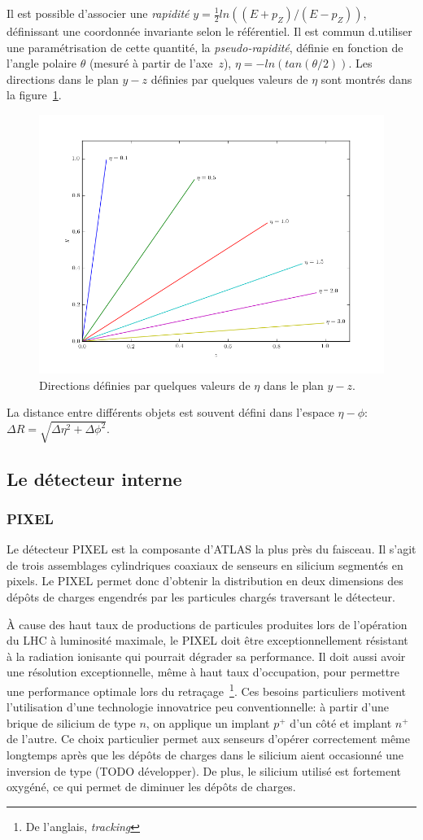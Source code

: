 Il est possible d'associer une \emph{rapidité}
$y = \frac{1}{2}ln((E + p_Z)/(E - p_Z))$, définissant une coordonnée
invariante selon le référentiel. Il est commun d.utiliser une
paramétrisation de cette quantité, la \emph{pseudo-rapidité}, définie
en fonction de l'angle polaire $\theta$ (mesuré à partir de
l'axe~$z$), $\eta = -ln(tan(\theta/2))$. Les directions dans le plan
$y-z$ définies par quelques valeurs de $\eta$ sont montrés dans la
figure~\ref{fig:eta}.

\begin{figure}[h]
  \centering
  \includegraphics[width=.5\textwidth]{eta.png}
  \caption{Directions définies par quelques valeurs de $\eta$ dans le plan $y-z$.}
  \label{fig:eta}
\end{figure}

La distance entre différents objets est souvent défini dans l'espace
$\eta-\phi$: $\Delta R = \sqrt{\Delta\eta^2 + \Delta\phi^2}$.


\subsection{Le détecteur interne}
\label{sec:lhc_atlas:atlas:indet}


\subsubsection{PIXEL}

Le détecteur PIXEL est la composante d'ATLAS la plus près du
faisceau. Il s'agit de trois assemblages cylindriques coaxiaux de
senseurs en silicium segmentés en pixels. Le PIXEL permet donc
d'obtenir la distribution en deux dimensions des dépôts de charges
engendrés par les particules chargés traversant le détecteur.

À cause des haut taux de productions de particules produites lors de
l'opération du LHC à luminosité maximale, le PIXEL doit être
exceptionnellement résistant à la radiation ionisante qui pourrait
dégrader sa performance. Il doit aussi avoir une résolution
exceptionnelle, même à haut taux d'occupation, pour permettre une
performance optimale lors du retraçage~\footnote{De l'anglais,
  \emph{tracking}}. Ces besoins particuliers motivent l'utilisation
d'une technologie innovatrice peu conventionnelle: à partir d'une
brique de silicium de type $n$, on applique un implant $p^+$ d'un côté
et implant $n^+$ de l'autre. Ce choix particulier permet aux senseurs
d'opérer correctement même longtemps après que les dépôts de charges
dans le silicium aient occasionné une inversion de type (TODO
développer). De plus, le silicium utilisé est fortement oxygéné, ce qui permet
de diminuer les dépôts de charges.

